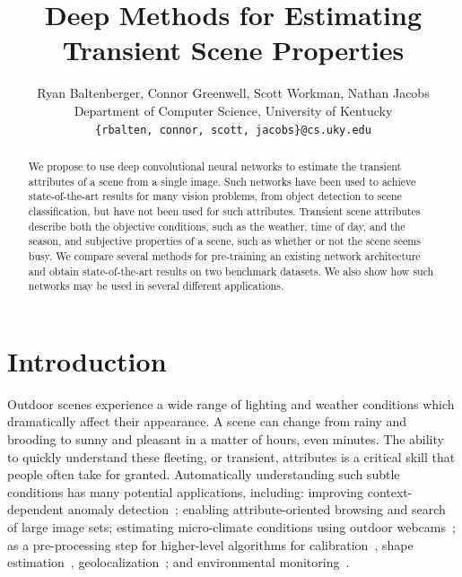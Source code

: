 \documentclass[10pt,twocolumn,letterpaper]{article}
\begin{document}
\title{Deep Methods for Estimating Transient Scene Properties}


\author{Ryan Baltenberger, Connor Greenwell, Scott Workman, Nathan Jacobs \\
  \vspace{-.75em} 
  Department of Computer Science, University of Kentucky \\
  {\tt\small \{rbalten, connor, scott, jacobs\}@cs.uky.edu}
}

\maketitle
\ifwacvfinal\thispagestyle{empty}\fi


\begin{abstract}

We propose to use deep convolutional neural networks to estimate the transient
attributes of a scene from a single image. Such networks have been used to
achieve state-of-the-art results for many vision problems, from object
detection to scene classification, but have not been used for such attributes.
Transient scene attributes describe both the objective conditions, such as the
weather, time of day, and the season, and subjective properties of a scene,
such as whether or not the scene seems busy. We compare several methods for
pre-training an existing network architecture and obtain state-of-the-art
results on two benchmark datasets.  We also show how such networks may be used
in several different applications.

\end{abstract}

\section{Introduction}
\indent
Outdoor scenes experience a wide range of lighting and weather conditions which
dramatically affect their appearance. A scene can change from rainy and
brooding to sunny and pleasant in a matter of hours, even minutes. The ability
to quickly understand these fleeting, or transient, attributes is a critical
skill that people often take for granted. Automatically understanding such
subtle conditions has many potential applications, including: improving
context-dependent anomaly detection~\cite{abrams12lost}; enabling
attribute-oriented browsing and search of large image
sets\cite{jacobs07amos,skyfinder}; estimating micro-climate conditions using
outdoor webcams~\cite{islam13webcamweather}; as a pre-processing step for
higher-level algorithms for
calibration~\cite{jacobs13cloudcalibration,workman2014rainbow}, shape
estimation~\cite{heliometric,abramsheliometric},
geolocalization~\cite{jacobs07geolocate}; and  environmental
monitoring~\cite{jacobs09webcamgis}. 
\end{document}
